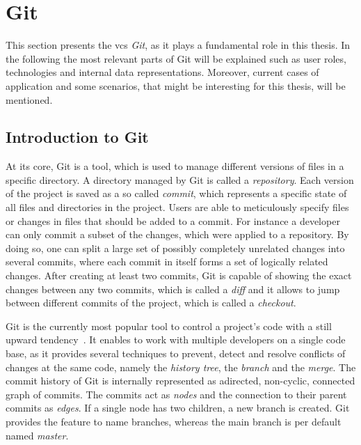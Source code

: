 \section{Git}\label{git-explanation}
This section presents the \ac{vcs} \emph{Git}, as it plays a fundamental role in this thesis.
In the following the most relevant parts of Git will be explained such as user roles, technologies and internal data representations.
Moreover, current cases of application and some scenarios, that might be interesting for this thesis, will be mentioned.


\subsection{Introduction to Git}\label{git-introduction}
At its core, Git is a tool, which is used to manage different versions of files in a specific directory. A directory managed by Git is called a \emph{repository}.
Each version of the project is saved as a so called \emph{commit}, which represents a specific state of all files and directories in the project.
Users are able to meticulously specify files or changes in files that should be added to a commit.
For instance a developer can only commit a subset of the changes, which were applied to a repository.
By doing so, one can split a large set of possibly completely unrelated changes into several commits, where each commit in itself forms a set of logically related changes.
After creating at least two commits, Git is capable of showing the exact changes between any two commits, which is called a \emph{diff} and it allows to jump between different commits of the project, which is called a \emph{checkout}.

Git is the currently most popular tool to control a project's code with a still upward tendency~\cite{article:git-popularity}.
It enables to work with multiple developers on a single code base, as it provides several techniques to prevent, detect and resolve conflicts of changes at the same code, namely the \emph{history tree}, the \emph{branch} and the \emph{merge}.
The commit history of Git is internally represented as adirected, non-cyclic, connected graph of commits.
The commits act as \emph{nodes} and the connection to their parent commits as \emph{edges}.
If a single node has two children, a new branch is created.
Git provides the feature to name branches, whereas the main branch is per default named \emph{master}.

